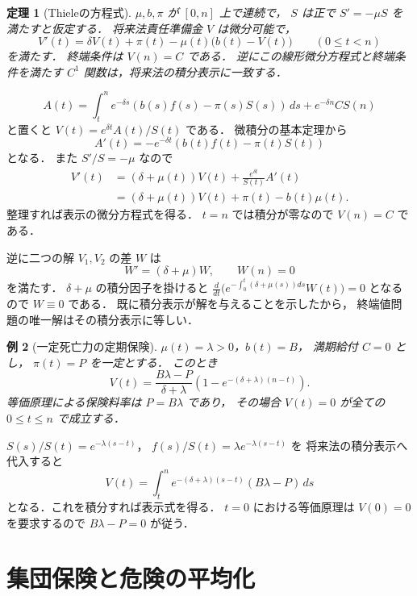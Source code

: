 \documentclass[a5paper,10pt,onecolumn]{jsarticle}
\makeatletter
\theoremstyle{mathnotetheorem}
\newtheorem{theorem}{定理}[section]
\newtheorem{example}[theorem]{例}
\renewcommand{\proofname}{証明}
\renewenvironment{proof}[1][\proofname]{%
  \par\pushQED{\qed}\normalfont\topsep4\p@\@plus2\p@\relax
  \trivlist\item[\hskip\labelsep\bfseries #1]\ignorespaces
}{\popQED\endtrivlist\@endpefalse}
\makeatother
\begin{document}
\begin{theorem}[Thieleの方程式]\label{thm:thiele}
$\mu,b,\pi$ が $[0,n]$ 上で連続で，
$S$ は正で $S'=-\mu S$ を満たすと仮定する．
将来法責任準備金 $V$ は微分可能で，
\[
 V'(t)=\delta V(t)+\pi(t)
       -\mu(t)\bigl(b(t)-V(t)\bigr)
 \qquad(0\le t<n)
\]
を満たす．
終端条件は $V(n)=C$ である．
逆にこの線形微分方程式と終端条件を満たす
$C^1$ 関数は，将来法の積分表示に一致する．
\end{theorem}
\begin{proof}
\[
 A(t)=
 \int_t^n e^{-\delta s}
 (b(s)f(s)-\pi(s)S(s))\,ds
 +e^{-\delta n}C S(n)
\]
と置くと $V(t)=e^{\delta t}A(t)/S(t)$ である．
微積分の基本定理から
\[
 A'(t)=-e^{-\delta t}(b(t)f(t)-\pi(t)S(t))
\]
となる．
また $S'/S=-\mu$ なので
\begin{align*}
 V'(t)
 &=(\delta+\mu(t))V(t)
   +\frac{e^{\delta t}}{S(t)}A'(t)\\
 &=(\delta+\mu(t))V(t)+\pi(t)-b(t)\mu(t).
\end{align*}
整理すれば表示の微分方程式を得る．
$t=n$ では積分が零なので $V(n)=C$ である．

逆に二つの解 $V_1,V_2$ の差 $W$ は
\[
 W'=(\delta+\mu)W,\qquad W(n)=0
\]
を満たす．
$\delta+\mu$ の積分因子を掛けると
$\frac d{dt}\bigl(
 e^{-\int_0^t(\delta+\mu(s))ds}W(t)\bigr)=0$
となるので $W\equiv0$ である．
既に積分表示が解を与えることを示したから，
終端値問題の唯一解はその積分表示に等しい．
\end{proof}

\begin{example}[一定死亡力の定期保険]
$\mu(t)=\lambda>0$，$b(t)=B$，
満期給付 $C=0$ とし，
$\pi(t)=P$ を一定とする．
このとき
\[
 V(t)=\frac{B\lambda-P}{\delta+\lambda}
 \left(1-e^{-(\delta+\lambda)(n-t)}\right).
\]
等価原理による保険料率は $P=B\lambda$ であり，
その場合 $V(t)=0$ が全ての $0\le t\le n$ で成立する．
\end{example}
\begin{proof}
$S(s)/S(t)=e^{-\lambda(s-t)}$，
$f(s)/S(t)=\lambda e^{-\lambda(s-t)}$ を
将来法の積分表示へ代入すると
\[
 V(t)=\int_t^n
 e^{-(\delta+\lambda)(s-t)}(B\lambda-P)\,ds
\]
となる．これを積分すれば表示式を得る．
$t=0$ における等価原理は $V(0)=0$ を要求するので
$B\lambda-P=0$ が従う．
\end{proof}

\section{集団保険と危険の平均化}
\end{document}
